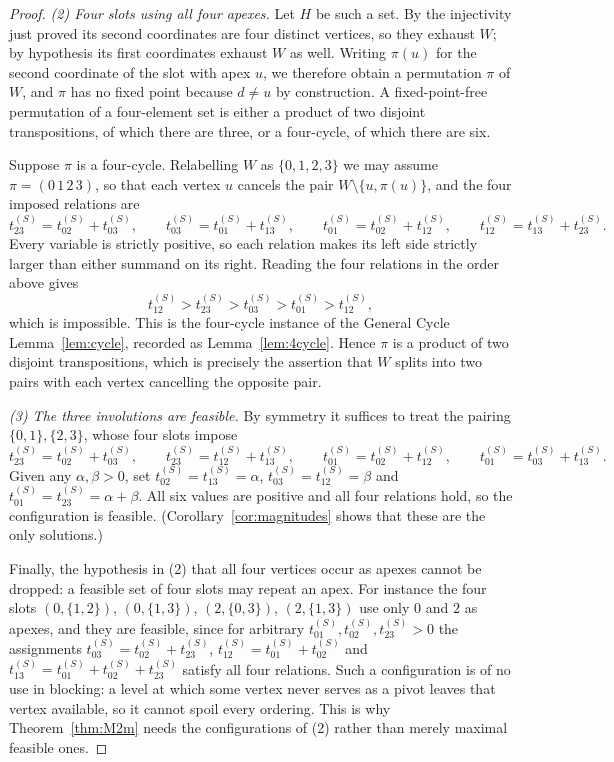 \documentclass[11pt]{article}
\theoremstyle{plain}
\theoremstyle{definition}
\theoremstyle{remark}
\begin{document}
\begin{aiblock}
\begin{proof}
\emph{(2) Four slots using all four apexes.} Let $H$ be such a set. By the injectivity just proved its
second coordinates are four distinct vertices, so they exhaust $W$; by hypothesis its first coordinates
exhaust $W$ as well. Writing $\pi(u)$ for the second coordinate of the slot with apex $u$, we therefore
obtain a permutation $\pi$ of $W$, and $\pi$ has no fixed point because $d\neq u$ by construction. A
fixed-point-free permutation of a four-element set is either a product of two disjoint transpositions,
of which there are three, or a four-cycle, of which there are six.

Suppose $\pi$ is a four-cycle. Relabelling $W$ as $\{0,1,2,3\}$ we may assume
$\pi=(0\,1\,2\,3)$, so that each vertex $u$ cancels the pair $W\setminus\{u,\pi(u)\}$, and the four
imposed relations are
\[
  t^{(S)}_{23}=t^{(S)}_{02}+t^{(S)}_{03},\qquad
  t^{(S)}_{03}=t^{(S)}_{01}+t^{(S)}_{13},\qquad
  t^{(S)}_{01}=t^{(S)}_{02}+t^{(S)}_{12},\qquad
  t^{(S)}_{12}=t^{(S)}_{13}+t^{(S)}_{23}.
\]
Every variable is strictly positive, so each relation makes its left side strictly larger than either
summand on its right. Reading the four relations in the order above gives
\[
  t^{(S)}_{12}>t^{(S)}_{23}>t^{(S)}_{03}>t^{(S)}_{01}>t^{(S)}_{12},
\]
which is impossible. This is the four-cycle instance of the General Cycle
Lemma~\ref{lem:cycle}, recorded as Lemma~\ref{lem:4cycle}. Hence $\pi$ is a product of two disjoint
transpositions, which is precisely the assertion that $W$ splits into two pairs with each vertex
cancelling the opposite pair.

\emph{(3) The three involutions are feasible.} By symmetry it suffices to treat the pairing
$\{0,1\},\{2,3\}$, whose four slots impose
\[
  t^{(S)}_{23}=t^{(S)}_{02}+t^{(S)}_{03},\qquad
  t^{(S)}_{23}=t^{(S)}_{12}+t^{(S)}_{13},\qquad
  t^{(S)}_{01}=t^{(S)}_{02}+t^{(S)}_{12},\qquad
  t^{(S)}_{01}=t^{(S)}_{03}+t^{(S)}_{13}.
\]
Given any $\alpha,\beta>0$, set $t^{(S)}_{02}=t^{(S)}_{13}=\alpha$, $t^{(S)}_{03}=t^{(S)}_{12}=\beta$
and $t^{(S)}_{01}=t^{(S)}_{23}=\alpha+\beta$. All six values are positive and all four relations hold,
so the configuration is feasible. (Corollary~\ref{cor:magnitudes} shows that these are the only
solutions.)

Finally, the hypothesis in (2) that all four vertices occur as apexes cannot be dropped: a feasible
set of four slots may repeat an apex. For instance the four slots $(0,\{1,2\})$, $(0,\{1,3\})$,
$(2,\{0,3\})$, $(2,\{1,3\})$ use only $0$ and $2$ as apexes, and they are feasible, since for
arbitrary $t^{(S)}_{01},t^{(S)}_{02},t^{(S)}_{23}>0$ the assignments
$t^{(S)}_{03}=t^{(S)}_{02}+t^{(S)}_{23}$, $t^{(S)}_{12}=t^{(S)}_{01}+t^{(S)}_{02}$ and
$t^{(S)}_{13}=t^{(S)}_{01}+t^{(S)}_{02}+t^{(S)}_{23}$ satisfy all four relations. Such a configuration
is of no use in blocking: a level at which some vertex never serves as a pivot leaves that vertex
available, so it cannot spoil every ordering. This is why Theorem~\ref{thm:M2m} needs the
configurations of (2) rather than merely maximal feasible ones.
\end{proof}


\end{aiblock}
\end{document}

